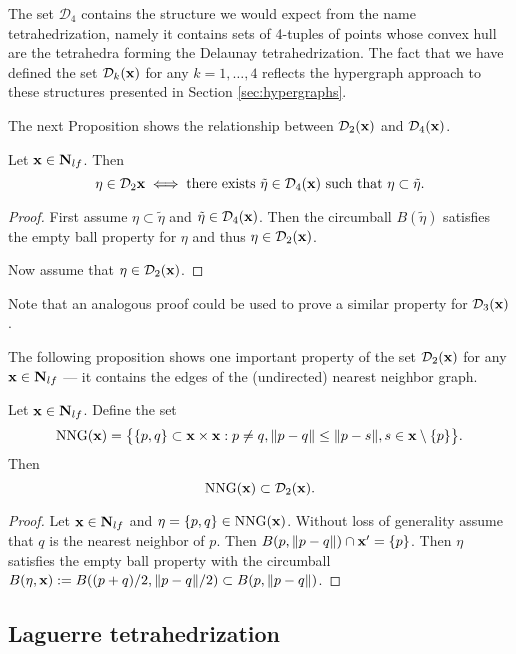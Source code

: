 The set $\mathcal D_4$ contains the structure we would expect from the name tetrahedrization, namely it contains sets of 4-tuples of points whose convex hull are the tetrahedra  forming the Delaunay tetrahedrization. The fact that we have defined the set $\mathcal D_k({\mathbf{x}})$ for any $k=1,\dots,4$ reflects the hypergraph approach to these structures presented in Section \ref{sec:hypergraphs}.

The next Proposition shows the relationship between $\mathcal D_2({\mathbf{x}})$ and $\mathcal D_4({\mathbf{x}})$.
\begin{proposition}
	Let ${\mathbf{x}}\in\mathbf N_{lf}$. Then
	$$\eta \in \mathcal D_2{{\mathbf{x}}} \iff \text{there exists } \tilde\eta \in \mathcal D_4({\mathbf{x}}) \text{ such that } \eta\subset \tilde \eta.$$
\end{proposition}
\begin{proof}
	First assume $\eta \subset \tilde \eta$ and $\tilde\eta \in \mathcal D_4({\mathbf{x}})$. Then the circumball $B(\tilde\eta)$ satisfies the empty ball property for $\eta$ and thus $\eta \in \mathcal D_2({\mathbf{x}})$.

	Now assume that $\eta \in \mathcal D_2({\mathbf{x}})$. \tbd
\end{proof}
Note that an analogous proof could be used to prove a similar property for $\mathcal D_3({\mathbf{x}})$.\newline


\noindent The following proposition shows one important property of the set $\mathcal D_2({\mathbf{x}})$ for any ${\mathbf{x}} \in \mathbf N_{lf}$ --- it contains the edges of the (undirected) nearest neighbor graph.
\begin{proposition}\label{prop:nng}
	Let ${\mathbf{x}}\in\mathbf N_{lf}$. Define the set
	$$\mathrm{NNG}({\mathbf{x}}) = \big\{ \{p,q\}\subset {\mathbf{x}} \times {\mathbf{x}}: p\neq q, \|p-q\| \leq \|p-s\|, s\in {\mathbf{x}}\setminus\{p\}  \big\}.$$
	Then 
	$$\mathrm{NNG}({\mathbf{x}}) \subset \mathcal D_2({\mathbf{x}}).$$
\end{proposition}
\begin{proof}
	Let ${\mathbf{x}}\in \mathbf N_{lf}$ and $\eta =\{p,q\} \in \mathrm{NNG}({\mathbf{x}})$. Without loss of generality assume that $q$ is the nearest neighbor of $p$. Then $ B(p,\|p-q\|)\cap {\mathbf{x}}' = \{p\}$. Then $\eta$ satisfies the empty ball property with the circumball $ B(\eta,{\mathbf{x}}) := B((p+q)/2,\|p-q\|/2) \subset B(p,\|p-q\|)$.
\end{proof}



\subsection{Laguerre tetrahedrization}\label{sec:Laguerre}


